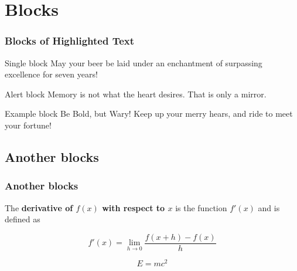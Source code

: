 \documentclass[aspectratio=169]{beamer}
\numberwithin{figure}{section}
\numberwithin{equation}{section}
\begin{document}
\section{Blocks}
\begin{frame}
 \frametitle{Blocks of Highlighted Text}
 \begin{block}{Single block}
  May your beer be laid under an enchantment of surpassing excellence for seven years!
 \end{block}

 \begin{alertblock}{Alert block}
  Memory is not what the heart desires. That is only a mirror.
 \end{alertblock}

 \begin{exampleblock}{Example block}
  Be Bold, but Wary! Keep up your merry hears, and ride to meet your fortune!
 \end{exampleblock}
\end{frame}

\subsection{Another blocks}
\begin{frame}
 \frametitle{Another blocks}
 \begin{definition}[Derivative]
  The \textbf{derivative of $f(x)$ with respect to $x$} is the function $f'(x)$ and is defined as
  
  \begin{equation}
   \label{eqn:definitionDerivative}
   f'(x) = \lim_{h \to 0} \frac{f(x+h) - f(x)}{h}
  \end{equation}
 \end{definition}

 \begin{theorem}
  \begin{equation}
   E = mc^2
  \end{equation}
 \end{theorem}
\end{frame}

\end{document}
